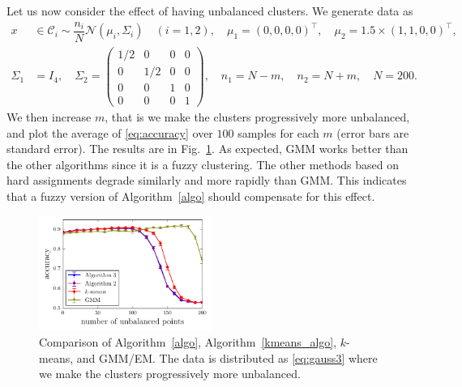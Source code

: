 \documentclass[aps,preprint,nofootinbib,floatfix]{revtex4-1}
\newcommand\C{{\mathcal{C}}}
\begin{document}
Let us now
consider the effect of having 
unbalanced clusters. We generate data as
\begin{equation}
\label{eq:gauss3}
\begin{split}
x &\in \C_i \sim  
\dfrac{n_i}{N} \mathcal{N}(\mu_i,\Sigma_i) \quad (i=1,2), \quad 
\mu_1 = (0,0,0,0)^\top , \quad
\mu_2 = 1.5\times (1,1,0,0)^\top, \\
\Sigma_1 &= I_4, \quad
\Sigma_2 = \left( 
\begin{smallmatrix} 
1/2 & 0 & 0 & 0\\
0 & 1/2 & 0 & 0 \\
0 & 0 & 1 & 0 \\
0 & 0 & 0 & 1 
\end{smallmatrix}\right), \quad
n_1 = N - m, \quad  n_2 = N + m, \quad N=200.
\end{split}
\end{equation}
We then increase $m$, 
that is we make the clusters progressively more unbalanced,
and plot the average of \eqref{eq:accuracy} 
over
$100$ samples for each $m$
(error bars are standard error). The results are in Fig.~\ref{fig:unbalanced}.
As expected, GMM
works better than the other algorithms since it is a fuzzy clustering.
The other methods based on hard assignments degrade similarly
and  more rapidly than GMM. This indicates that a fuzzy version of
Algorithm~\ref{algo} should compensate for this effect.

\begin{figure}
\includegraphics[width=0.5\textwidth]{gauss_pi.pdf}\vspace{-1em}
\caption{
\label{fig:unbalanced}
Comparison of Algorithm~\ref{algo}, Algorithm~\ref{kmeans_algo}, 
$k$-means, and GMM/EM. The data is distributed as \eqref{eq:gauss3} where
we make the clusters progressively more unbalanced.
}
\end{figure}
\end{document}
